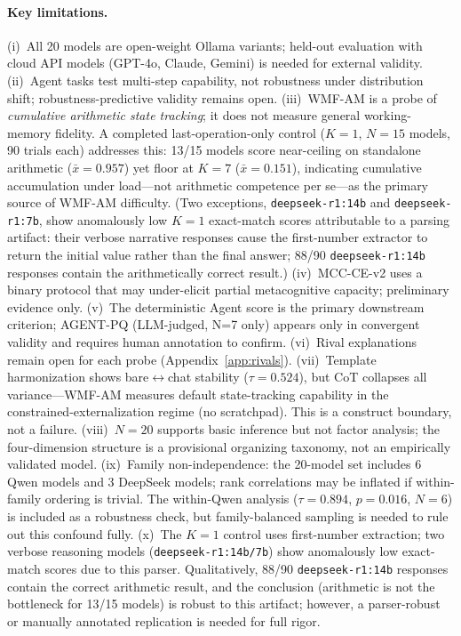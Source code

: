 \documentclass{article}
\begin{document}
\paragraph{Key limitations.}
(i)~All 20 models are open-weight Ollama variants; held-out evaluation
with cloud API models (GPT-4o, Claude, Gemini) is needed for external validity.
(ii)~Agent tasks test multi-step capability, not robustness under
distribution shift; robustness-predictive validity remains open.
(iii)~WMF-AM is a probe of \emph{cumulative arithmetic state tracking};
it does not measure general working-memory fidelity. A completed
last-operation-only control ($K{=}1$, $N{=}15$ models, 90 trials each)
addresses this: 13/15 models score near-ceiling on standalone arithmetic
($\bar{x}{=}0.957$) yet floor at $K{=}7$ ($\bar{x}{=}0.151$),
indicating cumulative accumulation under load—not arithmetic competence
per se—as the primary source of WMF-AM difficulty. (Two exceptions,
\texttt{deepseek-r1:14b} and \texttt{deepseek-r1:7b}, show anomalously
low $K{=}1$ exact-match scores attributable to a parsing artifact:
their verbose narrative responses cause the first-number extractor to
return the initial value rather than the final answer; 88/90
\texttt{deepseek-r1:14b} responses contain the arithmetically correct
result.)
(iv)~MCC-CE-v2 uses a binary protocol that may under-elicit partial
metacognitive capacity; preliminary evidence only.
(v)~The deterministic Agent score is the primary downstream criterion;
AGENT-PQ (LLM-judged, N=7 only) appears only in convergent validity and
requires human annotation to confirm.
(vi)~Rival explanations remain open for each probe
(Appendix~\ref{app:rivals}).
(vii)~Template harmonization shows bare$\leftrightarrow$chat stability
($\tau{=}0.524$), but CoT collapses all variance---WMF-AM measures
default state-tracking capability in the constrained-externalization
regime (no scratchpad). This is a construct boundary, not a failure.
(viii)~$N{=}20$ supports basic inference but not factor analysis;
the four-dimension structure is a provisional organizing taxonomy,
not an empirically validated model.
(ix)~Family non-independence: the 20-model set includes 6 Qwen models and
3 DeepSeek models; rank correlations may be inflated if within-family
ordering is trivial. The within-Qwen analysis ($\tau{=}0.894$,
$p{=}0.016$, $N{=}6$) is included as a robustness check, but
family-balanced sampling is needed to rule out this confound fully.
(x)~The $K{=}1$ control uses first-number extraction; two verbose
reasoning models (\texttt{deepseek-r1:14b/7b}) show anomalously low
exact-match scores due to this parser. Qualitatively, 88/90
\texttt{deepseek-r1:14b} responses contain the correct arithmetic
result, and the conclusion (arithmetic is not the bottleneck for 13/15
models) is robust to this artifact; however, a parser-robust or
manually annotated replication is needed for full rigor.
\end{document}
